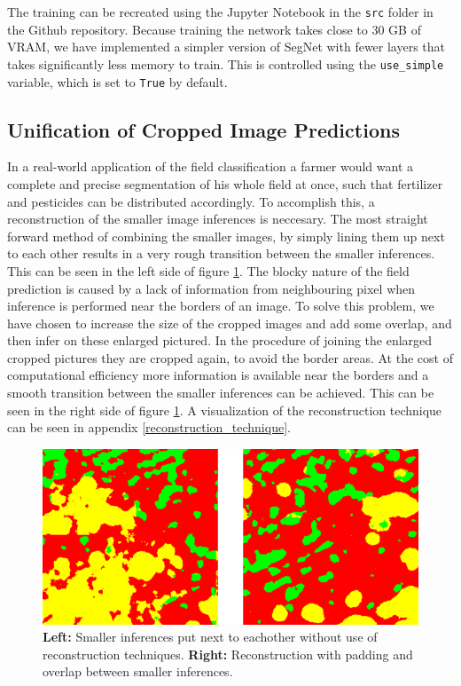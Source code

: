 \documentclass{article}
\begin{document}
The training can be recreated using the Jupyter Notebook in the \texttt{src} folder in the Github repository.
Because training the network takes close to 30 GB of VRAM, we have implemented a simpler version of SegNet with fewer layers that takes significantly less memory to train.
This is controlled using the \texttt{use\_simple} variable, which is set to \texttt{True} by default.


\subsection{Unification of Cropped Image Predictions}
In a real-world application of the field classification a farmer would want a complete and precise segmentation of his whole field at once, such that fertilizer and pesticides can be distributed accordingly. To accomplish this, a reconstruction of the smaller image inferences is neccesary. The most straight forward method of combining the smaller images, by simply lining them up next to each other results in a very rough transition between the smaller inferences. This can be seen in the left side of figure \ref{fig:earlylatereconstruction}. The blocky nature of the field prediction is caused by a lack of information from neighbouring pixel when inference is performed near the borders of an image. To solve this problem, we have chosen to increase the size of the cropped images and add some overlap, and then infer on these enlarged pictured. In the procedure of joining the enlarged cropped pictures they are cropped again, to avoid the border areas. At the cost of computational efficiency more information is available near the borders and a smooth transition between the smaller inferences can be achieved. This can be seen in the right side of figure \ref{fig:earlylatereconstruction}. A visualization of the reconstruction technique can be seen in appendix \ref{reconstruction_technique}.



\begin{figure}
	\centering
	\includegraphics[width=0.9\linewidth]{early_late_reconstruction2}
	\caption{\textbf{Left:} Smaller inferences put next to eachother without use of reconstruction techniques. \textbf{Right:} Reconstruction with padding and overlap between smaller inferences.}
	\label{fig:earlylatereconstruction}
\end{figure}
\end{document}
